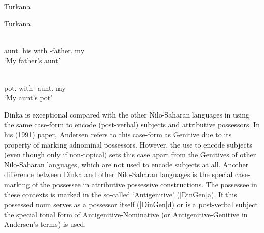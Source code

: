 \begin{exe}\ex\label{TurGen} {Turkana} \citep[Nilotic; Kenya; ][267, 384, 167]{Dimmendaal:1982}\nopagebreak[4]
\end{exe}

\begin{exe}\ex\label{TurGenKin} {Turkana} \citep[340]{Dimmendaal:1982}\nopagebreak[4]
\begin{xlist}
\ex\gll{}   \textbf{} \\
aunt.\acc{} his with \NC{}-father.\acc{} my\\
`My father's aunt' %

\ex\gll {}  \textbf{} \\
pot.\acc{} with \NC{}-aunt.\acc{} my\\
`My aunt's pot' %
\end{xlist}
\end{exe}

Dinka is exceptional compared with the other Nilo-Saharan languages in using the same case-form to encode (post-verbal) subjects and attributive possessors. 
In his (1991) paper, Andersen refers to this case-form as Genitive due to its property of marking adnominal possessors. 
However, the use to encode subjects (even though only if non-topical) sets this case apart from the Genitives of other Nilo-Saharan languages, which are not used to encode subjects at all. 
Another difference between Dinka and other Nilo-Saharan languages is the special case-marking of the possessee in attributive possessive constructions. 
The possessee in these contexts is marked in the so-called `Antigenitive' (\ref{DinGen}a).
If this possessed noun serves as a possessor itself (\ref{DinGen}d) or is a post-verbal subject the special tonal form of Antigenitive-Nominative (or Antigenitive-Genitive in Andersen's terms) is used.  

